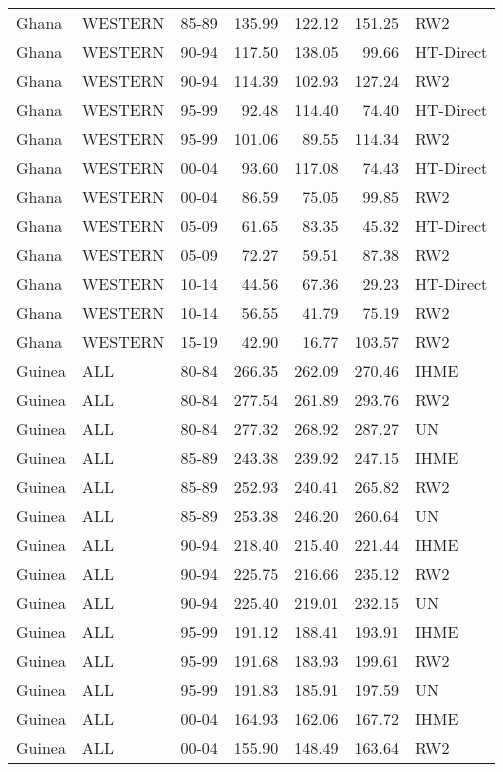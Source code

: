 \begin{longtable}{lllrrrl}
  Ghana & WESTERN & 85-89 & 135.99 & 122.12 & 151.25 & RW2 \\ 
  Ghana & WESTERN & 90-94 & 117.50 & 138.05 & 99.66 & HT-Direct \\ 
  Ghana & WESTERN & 90-94 & 114.39 & 102.93 & 127.24 & RW2 \\ 
  Ghana & WESTERN & 95-99 & 92.48 & 114.40 & 74.40 & HT-Direct \\ 
  Ghana & WESTERN & 95-99 & 101.06 & 89.55 & 114.34 & RW2 \\ 
  Ghana & WESTERN & 00-04 & 93.60 & 117.08 & 74.43 & HT-Direct \\ 
  Ghana & WESTERN & 00-04 & 86.59 & 75.05 & 99.85 & RW2 \\ 
  Ghana & WESTERN & 05-09 & 61.65 & 83.35 & 45.32 & HT-Direct \\ 
  Ghana & WESTERN & 05-09 & 72.27 & 59.51 & 87.38 & RW2 \\ 
  Ghana & WESTERN & 10-14 & 44.56 & 67.36 & 29.23 & HT-Direct \\ 
  Ghana & WESTERN & 10-14 & 56.55 & 41.79 & 75.19 & RW2 \\ 
  Ghana & WESTERN & 15-19 & 42.90 & 16.77 & 103.57 & RW2 \\ 
  Guinea & ALL & 80-84 & 266.35 & 262.09 & 270.46 & IHME \\ 
  Guinea & ALL & 80-84 & 277.54 & 261.89 & 293.76 & RW2 \\ 
  Guinea & ALL & 80-84 & 277.32 & 268.92 & 287.27 & UN \\ 
  Guinea & ALL & 85-89 & 243.38 & 239.92 & 247.15 & IHME \\ 
  Guinea & ALL & 85-89 & 252.93 & 240.41 & 265.82 & RW2 \\ 
  Guinea & ALL & 85-89 & 253.38 & 246.20 & 260.64 & UN \\ 
  Guinea & ALL & 90-94 & 218.40 & 215.40 & 221.44 & IHME \\ 
  Guinea & ALL & 90-94 & 225.75 & 216.66 & 235.12 & RW2 \\ 
  Guinea & ALL & 90-94 & 225.40 & 219.01 & 232.15 & UN \\ 
  Guinea & ALL & 95-99 & 191.12 & 188.41 & 193.91 & IHME \\ 
  Guinea & ALL & 95-99 & 191.68 & 183.93 & 199.61 & RW2 \\ 
  Guinea & ALL & 95-99 & 191.83 & 185.91 & 197.59 & UN \\ 
  Guinea & ALL & 00-04 & 164.93 & 162.06 & 167.72 & IHME \\ 
  Guinea & ALL & 00-04 & 155.90 & 148.49 & 163.64 & RW2 \\ 

\end{longtable}
